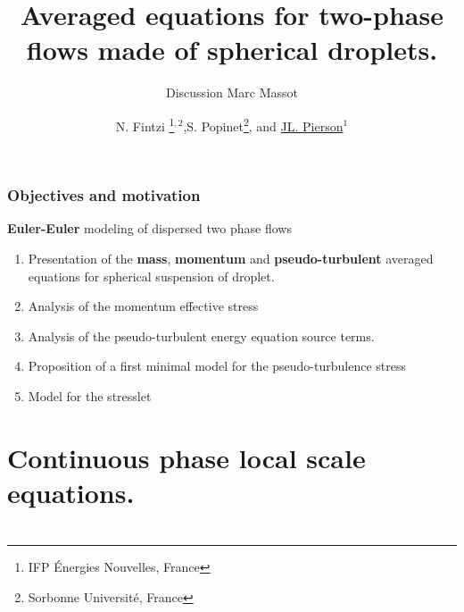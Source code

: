 \documentclass{sintefbeamer}
\title{Averaged equations for two-phase flows made of spherical droplets. }
\subtitle{Discussion Marc Massot}
\author{N. Fintzi \footnote{IFP \'Energies Nouvelles, France}$^{,2}$,S. Popinet\footnote{Sorbonne Universit\'e, France}, and \underline{JL. Pierson$^1$}}
\begin{document}
\maketitle
\section*{}

\begin{frame}
  \frametitle{Objectives and motivation}



\textbf{Euler-Euler} modeling of dispersed two phase flows 
\vfill
\begin{enumerate}
  \item Presentation of the \textbf{mass}, \textbf{momentum} and \textbf{pseudo-turbulent} averaged equations for spherical suspension of droplet. 
  \item Analysis of the momentum effective stress
  \item Analysis of the pseudo-turbulent energy equation source terms. 
  \item Proposition of a first minimal model for the pseudo-turbulence stress
  \item Model for the stresslet
\end{enumerate}





\end{frame}

\section{Continuous phase local scale equations.}
\section*{}
\end{document}

